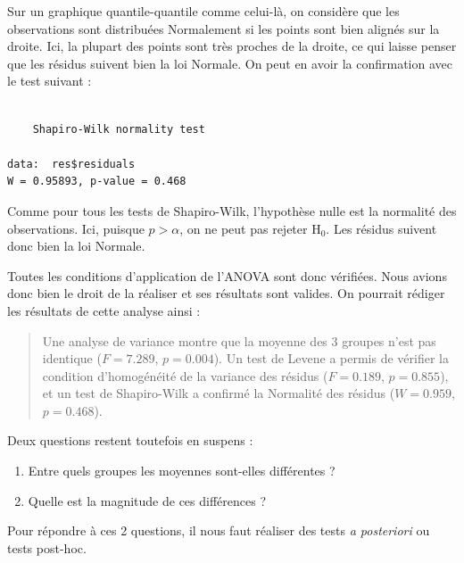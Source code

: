 \documentclass[a4paperpaper,]{article}
\newenvironment{Shaded}{\begin{snugshade}}{\end{snugshade}}
\newcommand{\KeywordTok}[1]{\textcolor[rgb]{0.12,0.11,0.11}{\textbf{#1}}}
\newcommand{\NormalTok}[1]{\textcolor[rgb]{0.12,0.11,0.11}{#1}}
\newcommand{\OperatorTok}[1]{\textcolor[rgb]{0.12,0.11,0.11}{#1}}
\providecommand{\tightlist}{%
  \setlength{\itemsep}{0pt}\setlength{\parskip}{0pt}}
\begin{document}
Sur un graphique quantile-quantile comme celui-là, on considère que les observations sont distribuées Normalement si les points sont bien alignés sur la droite. Ici, la plupart des points sont très proches de la droite, ce qui laisse penser que les résidus suivent bien la loi Normale. On peut en avoir la confirmation avec le test suivant :

\begin{Shaded}
\end{Shaded}

\begin{verbatim}

    Shapiro-Wilk normality test

data:  res$residuals
W = 0.95893, p-value = 0.468
\end{verbatim}

Comme pour tous les tests de Shapiro-Wilk, l'hypothèse nulle est la normalité des observations. Ici, puisque \(p > \alpha\), on ne peut pas rejeter H\(_0\). Les résidus suivent donc bien la loi Normale.

Toutes les conditions d'application de l'ANOVA sont donc vérifiées. Nous avions donc bien le droit de la réaliser et ses résultats sont valides. On pourrait rédiger les résultats de cette analyse ainsi :

\begin{quote}
Une analyse de variance montre que la moyenne des 3 groupes n'est pas identique (\(F = 7.289\), \(p = 0.004\)). Un test de Levene a permis de vérifier la condition d'homogénéité de la variance des résidus (\(F = 0.189\), \(p = 0.855\)), et un test de Shapiro-Wilk a confirmé la Normalité des résidus (\(W = 0.959\), \(p = 0.468\)).
\end{quote}

Deux questions restent toutefois en suspens :

\begin{enumerate}
\def\labelenumi{\arabic{enumi}.}
\tightlist
\item
  Entre quels groupes les moyennes sont-elles différentes ?
\item
  Quelle est la magnitude de ces différences ?
\end{enumerate}

Pour répondre à ces 2 questions, il nous faut réaliser des tests \emph{a posteriori} ou tests post-hoc.
\end{document}
